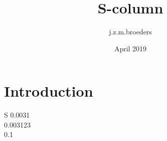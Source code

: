 \documentclass{article}
\title{S-column}
\author{j.z.m.broeders }
\date{April 2019}
\begin{document}
	
	\maketitle
	
	\section{Introduction}
	
	\begin{tabular}{S}
		0.0031 \\
		0.003123 \\
		0.1 \\
	\end{tabular} 
	
	
\end{document}
